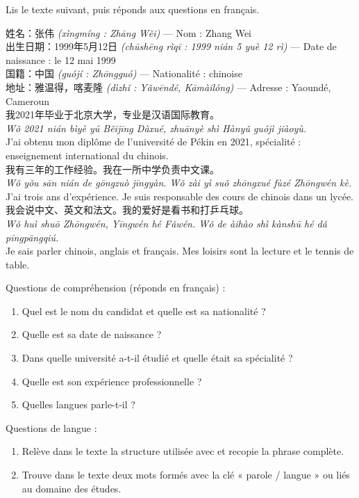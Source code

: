 \documentclass[11pt]{article}
\newcounter{popsec}
\newcounter{popsub}
\newcommand{\courssub}[1]{%
  \stepcounter{popsub}%
  \par\vspace{9pt}\noindent{\popxbold\fontsize{11.5}{13}\selectfont\color{popink}{\color{poporange}\thepopsec.\thepopsub}\hspace{6pt}#1}\par\nopagebreak\vspace{4pt}
}
\newcommand{\zh}[1]{\ifmmode\text{#1}\else{#1}\fi}
\begin{document}
\courssub{Je me prépare au Bac}

\begin{exercice}
Lis le texte suivant, puis réponds aux questions en français.
\begin{textebox}[张伟的简历]
姓名：张伟 \emph{(xìngmíng : Zhāng Wěi)} — Nom : Zhang Wei\\
出生日期：1999年5月12日 \emph{(chūshēng rìqī : 1999 nián 5 yuè 12 rì)} — Date de naissance : le 12 mai 1999\\
国籍：中国 \emph{(guójí : Zhōngguó)} — Nationalité : chinoise\\
地址：雅温得，喀麦隆 \emph{(dìzhǐ : Yǎwēndé, Kāmàilóng)} — Adresse : Yaoundé, Cameroun\\
我2021年毕业于北京大学，专业是汉语国际教育。\\
\emph{Wǒ 2021 nián bìyè yú Běijīng Dàxué, zhuānyè shì Hànyǔ guójì jiàoyù.}\\
J'ai obtenu mon diplôme de l'université de Pékin en 2021, spécialité : enseignement international du chinois.\\
我有三年的工作经验。我在一所中学负责中文课。\\
\emph{Wǒ yǒu sān nián de gōngzuò jīngyàn. Wǒ zài yì suǒ zhōngxué fùzé Zhōngwén kè.}\\
J'ai trois ans d'expérience. Je suis responsable des cours de chinois dans un lycée.\\
我会说中文、英文和法文。我的爱好是看书和打乒乓球。\\
\emph{Wǒ huì shuō Zhōngwén, Yīngwén hé Fǎwén. Wǒ de àihào shì kànshū hé dǎ pīngpāngqiú.}\\
Je sais parler chinois, anglais et français. Mes loisirs sont la lecture et le tennis de table.
\end{textebox}
Questions de compréhension (réponds en français) :
\begin{enumerate}
\item Quel est le nom du candidat et quelle est sa nationalité ?
\item Quelle est sa date de naissance ?
\item Dans quelle université a-t-il étudié et quelle était sa spécialité ?
\item Quelle est son expérience professionnelle ?
\item Quelles langues parle-t-il ?
\end{enumerate}
Questions de langue :
\begin{enumerate}
\item Relève dans le texte la structure utilisée avec \zh{毕业于} et recopie la phrase complète.
\item Trouve dans le texte deux mots formés avec la clé « parole / langue » ou liés au domaine des études.
\end{enumerate}
\end{exercice}
\end{document}
